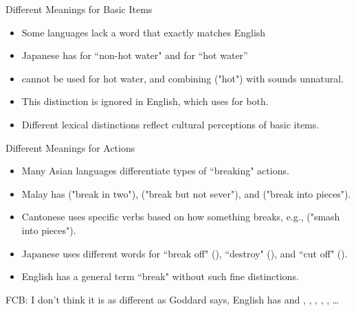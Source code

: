 \documentclass{beamer}
\begin{document}
\begin{frame}{Different Meanings for Basic Items}
    \begin{itemize}
        \item Some languages lack a word that exactly matches English 
        \item Japanese has  for ``non-hot water" and  for ``hot water''
        \item {} cannot be used for hot water, and combining  ("hot") with  sounds unnatural.
        \item This distinction is ignored in English, which uses  for both.
        \item Different lexical distinctions reflect cultural perceptions of basic items.
    \end{itemize}
\end{frame}

\begin{frame}{Different Meanings for Actions}
    \begin{itemize}
        \item Many Asian languages differentiate types of ``breaking" actions.
        \item Malay has  ("break in two"),  ("break but not sever"), and  ("break into pieces").
        \item Cantonese uses specific verbs based on how something breaks, e.g.,  ("smash into pieces").
        \item Japanese uses different words for ``break off" (), ``destroy" (), and ``cut off" ().
        \item English has a general term ``break" without such fine distinctions.
         
        \end{itemize}
FCB: I don't think it is as different as Goddard says, English has    and , , , , , \ldots    
        
\end{frame}
\end{document}
